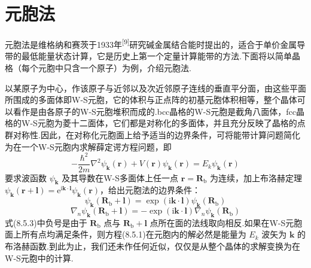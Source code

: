 \section{元胞法}

元胞法是维格纳和赛茨于1933年\textsuperscript{[9]}研究碱金属结合能时提出的，适合于单价金属导带的最低能量状态计算，它是历史上第一个定量计算能带的方法.下面将以简单晶格（每个元胞中只含一个原子）为例，介绍元胞法.

以某原子为中心，作该原子与近邻以及次近邻原子连线的垂直平分面，由这些平面所围成的多面体即W-S元胞，它的体积与正点阵的初基元胞体积相等，整个晶体可以看作是由各原子的W-S元胞堆积而成的.bcc晶格的W-S元胞是截角八面体，fcc晶格的W-S元胞为菱十二面体，它们都是对称化的多面体，并且充分反映了晶格的点群对称性.因此，在对称化元胞面上给予适当的边界条件，可将能带计算问题简化为在一个W-S元胞内求解薛定谔方程问题，即
\begin{equation}
  -\frac{\hbar^{2}}{2m}\nabla^{2}\psi_{\boldsymbol{k}}(\boldsymbol{r})
  +V(\boldsymbol{r})\psi_{\boldsymbol{k}}(\boldsymbol{r})=E_{k}\psi_{\boldsymbol{k}}(\boldsymbol{r})
\end{equation}
要求波函数 $\psi_{\boldsymbol{k}}$ 及其导数在W-S多面体上任一点 $\boldsymbol{r}=\boldsymbol{R}_{\mathrm{b}}$ 为连续，加上布洛赫定理 $\psi_{\boldsymbol{k}}(\boldsymbol{r}+\boldsymbol{l})=\mathrm{e}^{\mathrm{i}\boldsymbol{k}\cdot\boldsymbol{l}}\psi_{\boldsymbol{k}}(\boldsymbol{r})$，给出元胞法的边界条件：
\begin{equation}
  \psi_{\boldsymbol{k}}(\boldsymbol{R}_{\mathrm{b}}+\boldsymbol{l})
  =\exp(\mathrm{i}\boldsymbol{k}\cdot\boldsymbol{l})\psi_{\boldsymbol{k}}(\boldsymbol{R}_{\mathrm{b}})
\end{equation}
\begin{equation}
  \nabla_{n}\psi_{\boldsymbol{k}}(\boldsymbol{R}_{\mathrm{b}}+\boldsymbol{l})
  =-\exp(\mathrm{i}\boldsymbol{k}\cdot\boldsymbol{l})\nabla_{n}\psi_{\boldsymbol{k}}(\boldsymbol{R}_{\mathrm{b}})
\end{equation}
式(8.5.3)中负号是由于 $\boldsymbol{R}_{\mathrm{b}}$ 点与 $\boldsymbol{R}_{\mathrm{b}}+\boldsymbol{l}$ 点所在面的法线取向相反.如果在W-S元胞面上所有点均满足条件，则方程(8.5.1)在元胞内的解必然是能量为 $E_{k}$ 波矢为 $\boldsymbol{k}$ 的布洛赫函数.到此为止，我们还未作任何近似，仅仅是从整个晶体的求解变换为在W-S元胞中的计算.


